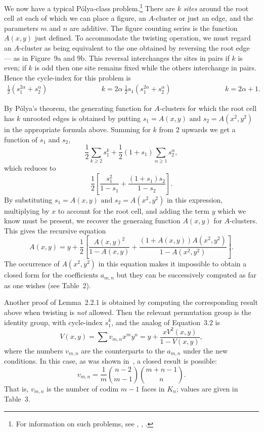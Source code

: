 \documentclass[10pt]{amsart}
\begin{document}
We now have a typical P\'{o}lya-class problem.\footnote{For information on such problems, see \cite{pol}, \cite{pr}, \cite{r3}.} There are $k$ {\em sites} around the root cell at each of which we can place a figure, an $A$-cluster or just an edge, and the parameters $m$ and $n$ are additive.  The figure counting series is the function $A(x,y)$ just defined.   To accommodate the twisting operation, we must regard an $A$-cluster as being equivalent to the one obtained by reversing the root edge --- as in Figure~9a and 9b. This reversal interchanges the sites in pairs if $k$ is even;  if $k$ is odd then one site remains fixed while the others interchange in pairs.   Hence the cycle-index for this problem is
\begin{eqnarray*}
\frac{1}{2}(s_1^{2\alpha} + s_2^\alpha) & \hspace{1in} & k = 2\alpha \

\frac{1}{2}s_1(s_1^{2\alpha} + s_2^\alpha) & \hspace{1in} & k = 2\alpha + 1. \

\end{eqnarray*}

\vspace{-.2in}
\noindent By P\'{o}lya's theorem, the generating function for $A$-clusters for which the root cell has $k$ unrooted edges is obtained by putting $s_1 = A(x, y) \mbox{ and } s_2 = A(x^2, y^2)$ in the appropriate formula above. Summing for $k$ from 2 upwards we get a function of $s_1$ and $s_2$,
$$\frac{1}{2}\sum_{k\geq 2} s_1^k + \frac{1}{2}(1 + s_1)\sum_{\alpha \geq 1} s_2^\alpha,$$
which reduces to
$$\frac{1}{2} \left[ \frac{s_1^2}{1 - s_1} + \frac{(1+s_1)s_2}{1 - s_2} \right].$$
By substituting $s_1 = A(x, y) \mbox{ and } s_2 = A(x^2, y^2)$ in this expression, multiplying by $x$ to account for the root cell, and adding the term $y$ which we know must be present, we recover the generaing function $A(x,y)$ for $A$-clusters. This gives the recursive equation
\begin{equation}
A(x,y) = y + \frac{1}{2} \left[ \frac{A(x,y)^2}{1-A(x,y)} + 
\frac{(1+A(x,y))A(x^2,y^2)}{1-A(x^2,y^2)} \right].
\label{e:axy}
\end{equation}
The occurrence of $A(x^2, y^2)$ in this equation makes it impossible to obtain a closed form for the coefficients $a_{m,n}$ but they can be successively computed as far as one wishes (see Table~2).

\begin{rem}
Another proof of Lemma~2.2.1 is obtained by computing the corresponding result above when twisting is {\em not} allowed.  Then the relevant permutation group is the identity group, with cycle-index $s_1^k$, and the analog of Equation~3.2 is
$$V(x,y) = \sum v_{m,n} x^m y^n  =  y + \frac{xV^2(x,y)}{1 - V(x,y)},$$
where the numbers $v_{m,n}$ are the counterparts to the $a_{m,n}$ under the new conditions. In this case, as was shown in~\cite{r1}, a closed result is possible:
$$v_{m,n}  = \frac{1}{m} \binom{n-2}{m-1} \binom{m+n-1}{n}.$$
That is, $v_{m,n}$ is the number of codim $m-1$ faces in $K_n$; values are given in Table~3.
\end{rem}
\end{document}
